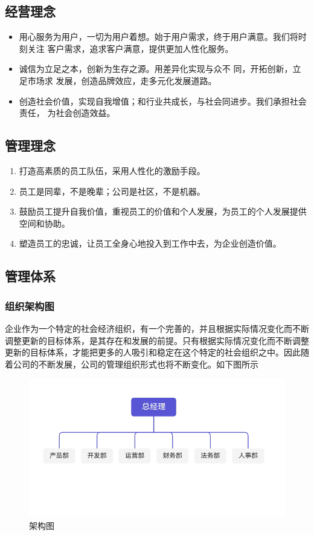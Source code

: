 \documentclass[UTF8]{ctexart}
\begin{document}
\subsection{经营理念}
\begin{itemize}
	\item 用心服务为用户，一切为用户着想。始于用户需求，终于用户满意。我们将时刻关注 客户需求，追求客户满意，提供更加人性化服务。
	\item 诚信为立足之本，创新为生存之源。用差异化实现与众不   同，开拓创新，立足市场求 发展，创造品牌效应，走多元化发展道路。
	\item 创造社会价值，实现自我增值；和行业共成长，与社会同进步。我们承担社会责任， 为社会创造效益。
\end{itemize}
\subsection{管理理念}

\begin{enumerate}[1.]
	\item 打造高素质的员工队伍，采用人性化的激励手段。
	\item 员工是同辈，不是晚辈；公司是社区，不是机器。
	\item 鼓励员工提升自我价值，重视员工的价值和个人发展，为员工的个人发展提供空间和协助。
	\item 塑造员工的忠诚，让员工全身心地投入到工作中去，为企业创造价值。
\end{enumerate}
\subsection{管理体系}
\subsubsection{组织架构图}
企业作为一个特定的社会经济组织，有一个完善的，并且根据实际情况变化而不断调整更新的目标体系，是其存在和发展的前提。只有根据实际情况变化而不断调整更新的目标体系，才能把更多的人吸引和稳定在这个特定的社会组织之中。因此随着公司的不断发展，公司的管理组织形式也将不断变化。如下图所示
\begin{figure}[H]
	\centering
	\includegraphics{Picture1.png}
	\caption{架构图}

\end{figure}
\end{document}
